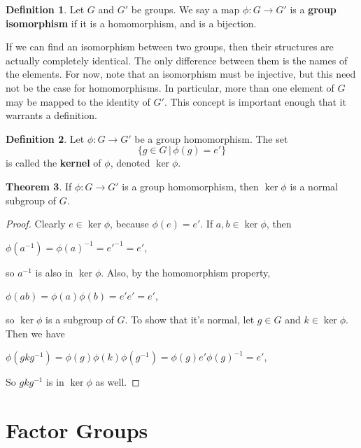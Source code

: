 \documentclass[12pt]{article}
\newcommand{\inv}[1]{#1^{-1}}
\theoremstyle{definition}
\newtheorem{theorem}{Theorem}[section]
\theoremstyle{definition}
\newtheorem{definition}[theorem]{Definition}
\theoremstyle{definition}
\theoremstyle{definition}
\begin{document}
\begin{definition}
Let $G$ and $G'$ be groups. We say a map $\phi: G \to G'$ is a \textbf{group isomorphism} if it is a homomorphism, and is a bijection.
\end{definition}

If we can find an isomorphism between two groups, then their structures are actually completely identical. The only difference between them is the names of the elements. For now, note that an isomorphism must be injective, but this need not be the case for homomorphisms. In particular, more than one element of $G$ may be mapped to the identity of $G'$. This concept is important enough that it warrants a definition.

\begin{definition}
Let $\phi: G \to G'$ be a group homomorphism. The set
\begin{equation*}
    \{g \in G \,|\, \phi(g) = e'\}
\end{equation*}
is called the \textbf{kernel} of $\phi$, denoted $\ker \phi$.
\end{definition}

\begin{theorem}
If $\phi: G \to G'$ is a group homomorphism, then $\ker\phi$ is a normal subgroup of $G$.
\end{theorem}

\begin{proof}
Clearly $e \in \ker\phi$, because $\phi(e) = e'$. If $a, b \in \ker\phi$, then
\begin{center}
    $\phi(\inv a) = \inv{\phi(a)} = \inv{e'} = e'$,
\end{center}
so $\inv a$ is also in $\ker\phi$. Also, by the homomorphism property,
\begin{center}
    $\phi(ab) = \phi(a)\phi(b) = e'e' = e'$,
\end{center}
so $\ker\phi$ is a subgroup of $G$. To show that it's normal, let $g \in G$ and $k \in \ker\phi$. Then we have
\begin{center}
    $\phi(gk\inv g) = \phi(g)\phi(k)\phi(\inv g) = \phi(g) e' \inv{\phi(g)} = e'$,
\end{center}
So $gk\inv g$ is in $\ker\phi$ as well.

\end{proof}

\section{Factor Groups}
\end{document}
